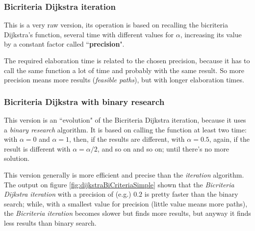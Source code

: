 \documentclass[a4paper,11pt]{report}
\begin{document}
\subsubsection{Bicriteria Dijkstra iteration}
This is a very raw version, its operation is based on recalling the bicriteria Dijkstra's function, several time with different values for $\alpha$, increasing its value by a constant factor called ``\textbf{precision}".

The required elaboration time is related to the chosen precision, because it has to call the same function a lot of time and probably with the same result. So more precision means more results (\textit{feasible paths}), but with longer elaboration times.

\subsubsection{Bicriteria Dijkstra with binary research}
This version is an ``evolution" of the Bicriteria Dijkstra iteration, because it uses a \textit{binary research} algorithm. It is based on calling the function at least two time: with $\alpha = 0$ and $\alpha=1$, then, if the results are different, with $\alpha=0.5$, again, if the result is different with $\alpha=\alpha/2$, and so on and so on; until there's no more solution.

This version generally is more efficient and precise than the \textit{iteration} algorithm. The output on figure \ref{fig:dijkstraBiCriteriaSimple} shown that the \textit{Bicriteria Dijkstra iteration} with a precision of (e.g.) $0.2$ is pretty faster than the binary search; while, with a smallest value for precision (little value means more paths), the \textit{Bicriteria iteration} becomes slower but finds more results, but anyway it finds less results than binary search.
\end{document}

